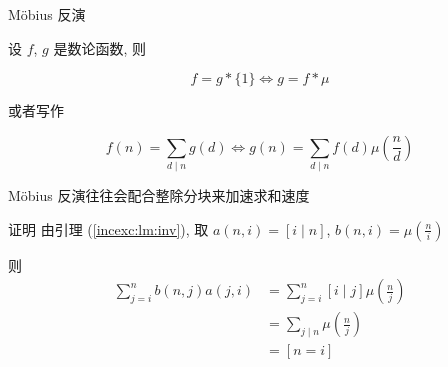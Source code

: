 \begin{frame}[fragile]{M\"obius 反演}
	\begin{theorem}[M\"obius 反演]
		\label{incexc:th:minv}
		设 \(f\), \(g\) 是数论函数, 则

		\begin{equation}
			\label{incexc:eq:minv1}
			f=g*\{1\}\iff g=f*\mu
		\end{equation}

		或者写作

		\begin{equation}
			\label{incexc:eq:minv2}
			f(n)=\sum_{d\mid n}g(d)\iff g(n)=\sum_{d\mid n}f(d)\mu\left(\frac{n}{d}\right)
		\end{equation}
	\end{theorem}

	\pause
	M\"obius 反演往往会配合整除分块来加速求和速度
\end{frame}


\begin{frame}{证明}
	由引理 (\ref{incexc:lm:inv}), 取 \(a(n,i)=[i\mid n]\), \(b(n,i)=\mu\left(\frac{n}{i}\right)\)

	\pause
	则
	\[
		\begin{aligned}
			\sum_{j=i}^n b(n,j)a(j,i) & =\sum_{j=i}^n [i\mid j]\mu\left(\frac{n}{j}\right) \\
			                          & =\sum_{j\mid n} \mu\left(\frac{n}{j}\right)        \\
			                          & =[n=i]
		\end{aligned}
	\]
\end{frame}
